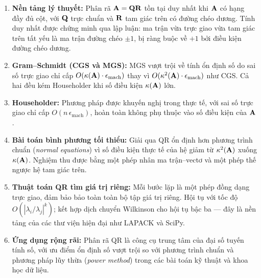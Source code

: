 \begin{enumerate}
    \item \textbf{Nền tảng lý thuyết:} Phân rã $\mathbf{A} = \mathbf{Q}\mathbf{R}$ tồn tại
          duy nhất khi $\mathbf{A}$ có hạng đầy đủ cột, với $\mathbf{Q}$ trực chuẩn và
          $\mathbf{R}$ tam giác trên có đường chéo dương. Tính duy nhất được chứng minh
          qua lập luận: ma trận vừa trực giao vừa tam giác trên tất yếu là ma trận
          đường chéo $\pm 1$, bị ràng buộc về $+1$ bởi điều kiện đường chéo dương.

    \item \textbf{Gram--Schmidt (CGS và MGS):} MGS vượt trội về tính ổn định số do
          sai số trực giao chỉ cấp $O(\kappa(\mathbf{A})\cdot\epsilon_{\text{mach}})$
          thay vì $O(\kappa^2(\mathbf{A})\cdot\epsilon_{\text{mach}})$ như CGS. Cả hai
          đều kém Householder khi số điều kiện $\kappa(\mathbf{A})$ lớn.

    \item \textbf{Householder:} Phương pháp được khuyến nghị trong thực tế, với sai
          số trực giao chỉ cấp $O(n\,\epsilon_{\text{mach}})$, hoàn toàn không phụ
          thuộc vào số điều kiện của $\mathbf{A}$.

    \item \textbf{Bài toán bình phương tối thiểu:} Giải qua QR ổn định hơn phương
          trình chuẩn (\textit{normal equations}) vì số điều kiện thực tế của hệ
          giảm từ $\kappa^2(\mathbf{A})$ xuống $\kappa(\mathbf{A})$. Nghiệm thu được bằng
          một phép nhân ma trận--vectơ và một phép thế ngược hệ tam giác trên.

    \item \textbf{Thuật toán QR tìm giá trị riêng:} Mỗi bước lặp là một phép đồng
          dạng trực giao, đảm bảo bảo toàn toàn bộ tập giá trị riêng. Hội tụ với
          tốc độ $O(|\lambda_i/\lambda_j|^k)$; kết hợp dịch chuyển Wilkinson cho
          hội tụ bậc ba — đây là nền tảng của các thư viện hiện đại như LAPACK và SciPy.

    \item \textbf{Ứng dụng rộng rãi:} Phân rã QR là công cụ trung tâm của đại số
          tuyến tính số, với ưu điểm ổn định số vượt trội so với phương trình chuẩn
          và phương pháp lũy thừa (\textit{power method}) trong các bài toán kỹ thuật
          và khoa học dữ liệu.
\end{enumerate}